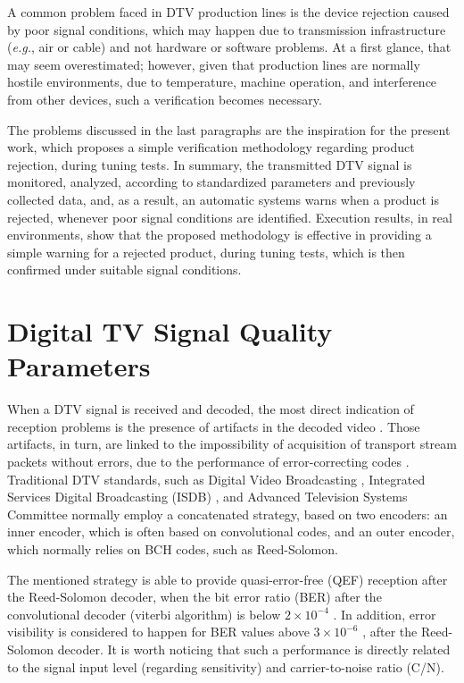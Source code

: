 \documentclass[conference]{IEEEtran}
\begin{document}
A common problem faced in DTV production lines is the device rejection caused by poor signal conditions, which may happen due to transmission infrastructure ({\it e.g.}, air or cable) and not hardware or software problems. At a first glance, that may seem overestimated; however, given that production lines are normally hostile environments, due to temperature, machine operation, and interference from other devices, such a verification becomes necessary.

The problems discussed in the last paragraphs are the inspiration for the present work, which proposes a simple verification methodology regarding product rejection, during tuning tests. In summary, the transmitted DTV signal is monitored, analyzed, according to standardized parameters and previously collected data, and, as a result, an automatic systems warns when a product is rejected, whenever poor signal conditions are identified. Execution results, in real environments, show that the proposed methodology is effective in providing a simple warning for a rejected product, during tuning tests, which is then confirmed under suitable signal conditions.

\section{Digital TV Signal Quality Parameters}\label{measure}
When a DTV signal is received and decoded, the most direct indication of reception problems is the presence of artifacts in the decoded video \cite{keith}. Those artifacts, in turn, are linked to the impossibility of acquisition of transport stream packets \cite{reimers,iso13818_1} without errors, due to the performance of error-correcting codes \cite{keith,reimers}. Traditional DTV standards, such as Digital Video Broadcasting \cite{dvb}, Integrated Services Digital Broadcasting (ISDB) \cite{isdb}, and Advanced Television Systems Committee \cite{atsc} normally employ a concatenated strategy, based on two encoders: an inner encoder, which is often based on convolutional codes, and an outer encoder, which normally relies on BCH codes, such as Reed-Solomon.

The mentioned strategy is able to provide quasi-error-free (QEF) reception after the Reed-Solomon decoder, when the bit error ratio (BER) after the convolutional decoder (viterbi algorithm) is below $2\times 10^{-4}$ \cite{dvb}. In addition, error visibility is considered to happen for BER values above $3\times 10^{-6}$ \cite{fcc}, after the Reed-Solomon decoder. It is worth noticing that such a performance is directly related to the signal input level (regarding sensitivity) and carrier-to-noise ratio (C/N).
\end{document}
